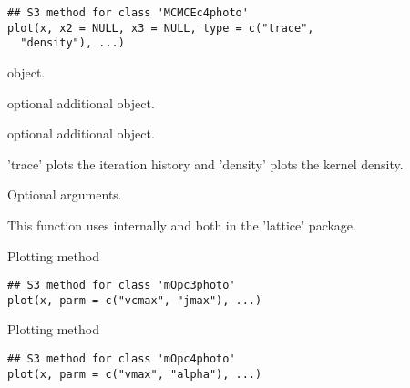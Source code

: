 \documentclass[letterpaper]{book}
\begin{document}
%
\begin{Usage}
\begin{verbatim}
## S3 method for class 'MCMCEc4photo'
plot(x, x2 = NULL, x3 = NULL, type = c("trace",
  "density"), ...)
\end{verbatim}
\end{Usage}
%
\begin{Arguments}
\begin{ldescription}
\item[\code{x}]  object.

\item[\code{x2}] optional additional 
object.

\item[\code{x3}] optional additional 
object.

\item[\code{type}] 'trace' plots the iteration history and
'density' plots the kernel density.

\item[\code{...}] Optional arguments.
\end{ldescription}
\end{Arguments}
%
\begin{Details}\relax
This function uses internally 
and  both in the
'lattice' package.
\end{Details}
%
\begin{SeeAlso}\relax
{}
\end{SeeAlso}
%
\begin{Description}\relax
Plotting method
\end{Description}
%
\begin{Usage}
\begin{verbatim}
## S3 method for class 'mOpc3photo'
plot(x, parm = c("vcmax", "jmax"), ...)
\end{verbatim}
\end{Usage}
%
\begin{Description}\relax
Plotting method
\end{Description}
%
\begin{Usage}
\begin{verbatim}
## S3 method for class 'mOpc4photo'
plot(x, parm = c("vmax", "alpha"), ...)
\end{verbatim}
\end{Usage}
\end{document}
